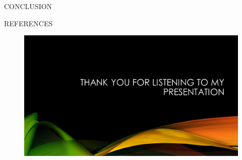 \documentclass[unknownkeysallowed, compress]{beamer}
\theoremstyle{plain}
\begin{document}
\begin{frame}[allowframebreaks]{CONCLUSION}
%
%
%
%
%
%
%
%
%
%
%
%
%
%
%
%
%

\end{frame}







\begin{frame}[allowframebreaks]{REFERENCES}

\nocite{*}

\end{frame}
\begin{frame}
   \begin{figure}[hp]
	\centering
		\includegraphics[width=1.00\textwidth]{image2.jpg}
\end{figure}
\end{frame}
\end{document}
